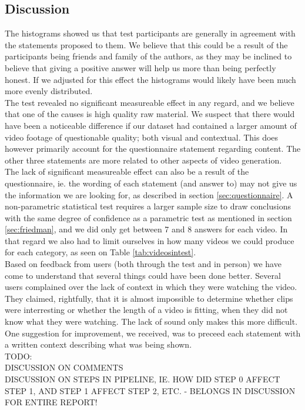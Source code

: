 \subsection{Discussion}
%
The histograms showed us that test participants are generally in agreement with the statements proposed to them. We believe that this could be a result of the participants being friends and family of the authors, as they may be inclined to believe that giving a positive answer will help us more than being perfectly honest. If we adjusted for this effect the histograms would likely have been much more evenly distributed.\\
%
The test revealed no significant measureable effect in any regard, and we believe that one of the causes is high quality raw material. We suspect that there would have been a noticeable difference if our dataset had contained a larger amount of video footage of questionable quality; both visual and contextual. This does however primarily account for the questionnaire statement regarding content. The other three statements are more related to other aspects of video generation.\\
The lack of significant measureable effect can also be a result of the questionnaire, ie. the wording of each statement (and answer to) may not give us the information we are looking for, as described in section \ref{sec:questionnaire}. A non-parametric statistical test requires a larger sample size to draw conclusions with the same degree of confidence as a parametric test as mentioned in section \ref{sec:friedman}, and we did only get between 7 and 8 answers for each video. In that regard we also had to limit ourselves in how many videos we could produce for each category, as seen on Table \ref{tab:videosintest}.\\
Based on feedback from users (both through the test and in person) we have come to understand that several things could have been done better. Several users complained over the lack of context in which they were watching the video. They claimed, rightfully, that it is almost impossible to determine whether clips were interresting or whether the length of a video is fitting, when they did not know what they were watching. The lack of sound only makes this more difficult. One suggestion for improvement, we received, was to preceed each statement with a written context describing what was being shown.\\
TODO:\\
DISCUSSION ON COMMENTS\\
DISCUSSION ON STEPS IN PIPELINE, IE. HOW DID STEP 0 AFFECT STEP 1, AND STEP 1 AFFECT STEP 2, ETC. - BELONGS IN DISCUSSION FOR ENTIRE REPORT!
%
